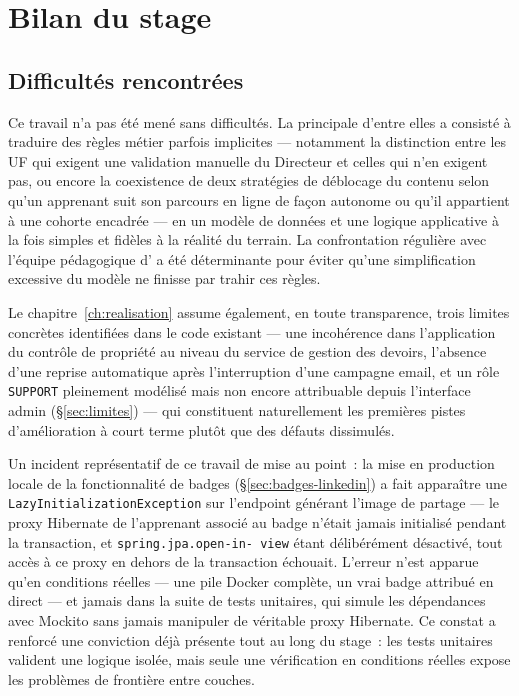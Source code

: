 \section{Bilan du stage}
\label{sec:bilan-difficultes}

\subsection{Difficultés rencontrées}

Ce travail n'a pas été mené sans difficultés. La principale d'entre elles
a consisté à traduire des règles métier parfois implicites --- notamment
la distinction entre les UF qui exigent une validation manuelle du
Directeur et celles qui n'en exigent pas, ou encore la coexistence de deux
stratégies de déblocage du contenu selon qu'un apprenant suit son parcours
en ligne de façon autonome ou qu'il appartient à une cohorte encadrée ---
en un modèle de données et une logique applicative à la fois simples et
fidèles à la réalité du terrain. La confrontation régulière avec l'équipe
pédagogique d'\Entreprise{} a été déterminante pour éviter qu'une
simplification excessive du modèle ne finisse par trahir ces règles.

Le chapitre~\ref{ch:realisation} assume également, en toute transparence,
trois limites concrètes identifiées dans le code existant --- une
incohérence dans l'application du contrôle de propriété au niveau du
service de gestion des devoirs, l'absence d'une reprise automatique
après l'interruption d'une campagne email, et un rôle \texttt{SUPPORT}
pleinement modélisé mais non encore attribuable depuis l'interface admin
(\S\ref{sec:limites}) --- qui constituent naturellement les premières
pistes d'amélioration à court terme plutôt que des défauts dissimulés.

Un incident représentatif de ce travail de mise au point~: la mise en
production locale de la fonctionnalité de badges
(\S\ref{sec:badges-linkedin}) a fait apparaître une
\texttt{LazyInitializationException} sur l'endpoint générant l'image de
partage --- le proxy Hibernate de l'apprenant associé au badge n'était
jamais initialisé pendant la transaction, et \texttt{spring.jpa.open-in-\allowbreak
view} étant délibérément désactivé, tout accès à ce proxy en dehors de la
transaction échouait.
L'erreur n'est apparue qu'en conditions réelles --- une pile Docker
complète, un vrai badge attribué en direct --- et jamais dans la suite de
tests unitaires, qui simule les dépendances avec Mockito sans jamais
manipuler de véritable proxy Hibernate. Ce constat a renforcé une
conviction déjà présente tout au long du stage~: les tests unitaires
valident une logique isolée, mais seule une vérification en conditions
réelles expose les problèmes de frontière entre couches.

